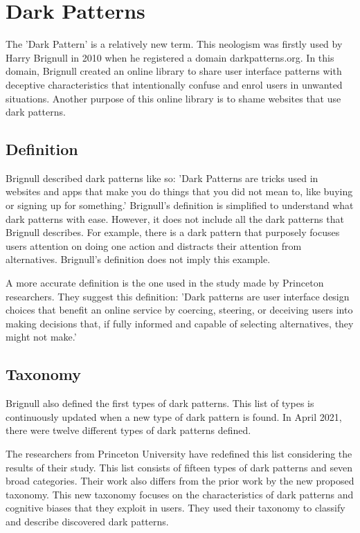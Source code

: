 \chapter{Dark Patterns}
The 'Dark Pattern' is a relatively new term. This neologism was firstly used by Harry Brignull in 2010\cite{dark-patterns-arstechnica} when he registered a domain darkpatterns.org. In this domain, Brignull created an online library to share user interface patterns with deceptive characteristics that intentionally confuse and enrol users in unwanted situations. Another purpose of this online library is to shame websites that use dark patterns.

\section{Definition}
Brignull described dark patterns like so: 'Dark Patterns are tricks used in websites and apps that make you do things that you did not mean to, like buying or signing up for something.'\cite{dark-patterns-brignull} Brignull's definition is simplified to understand what dark patterns with ease. However, it does not include all the dark patterns that Brignull describes. For example, there is a dark pattern that purposely focuses users attention on doing one action and distracts their attention from alternatives. Brignull's definition does not imply this example.

A more accurate definition is the one used in the study made by Princeton researchers. They suggest this definition: 'Dark patterns are user interface design choices that benefit an online service by coercing, steering, or deceiving users into making decisions that, if fully informed and capable of selecting alternatives, they might not make.' \cite{dark-patterns-at-scale}
\section{Taxonomy}

Brignull also defined the first types of dark patterns. This list of types is continuously updated when a new type of dark pattern is found. In April 2021, there were twelve different types of dark patterns defined\cite{dark-patterns-brignull-types}.

The researchers from Princeton University have redefined this list considering the results of their study. This list consists of fifteen types of dark patterns and seven broad categories. Their work also differs from the prior work\cite{dark-patterns-brignull,taxonomies-tales,taxonomies-conti} by the new proposed taxonomy. This new taxonomy focuses on the characteristics of dark patterns and cognitive biases that they exploit in users. They used their taxonomy to classify and describe discovered dark patterns.

